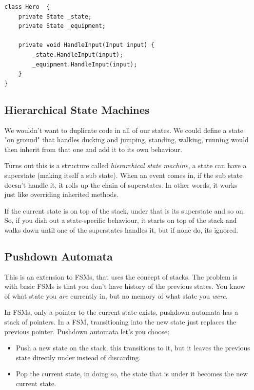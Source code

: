 \documentclass[a4paper, 12pt]{book}
\begin{document}
\begin{verbatim}
class Hero  {
    private State _state;
    private State _equipment;

    private void HandleInput(Input input) {
        _state.HandleInput(input);
        _equipment.HandleInput(input);
    }
}
\end{verbatim}

\subsection{Hierarchical State Machines}

We wouldn't want to duplicate code in all of our states. We could define a state "on ground" that handles ducking and jumping, standing, walking, running would then inherit from that one and add it to its own behaviour.

Turns out this is a structure called \emph{hierarchical state machine}, a state can have a superstate (making itself a sub state). When an event comes in, if the sub state doesn't handle it, it rolls up the chain of superstates. In other words, it works just like overriding inherited methods.

If the current state is on top of the stack, under that is its superstate and so on. So, if you dish out a state-specific behaviour, it starts on top of the stack and walks down until one of the superstates handles it, but if none do, its ignored.

\subsection{Pushdown Automata}

This is an extension to FSMs, that uses the concept of stacks. The problem is with basic FSMs is that you don't have history of the previous states. You know of what state you \emph{are} currently in, but no memory of what state you \emph{were}.

In FSMs, only a pointer to the current state exists, pushdown automata has a stack of pointers. In a FSM, transitioning into the new state just replaces the previous pointer. Pushdown automata let's you choose:
\begin{itemize}
    \item Push a new state on the stack, this transitions to it, but it leaves the previous state directly under instead of discarding.
    \item Pop the current state, in doing so, the state that is under it becomes the new current state.
\end{itemize}
\end{document}
